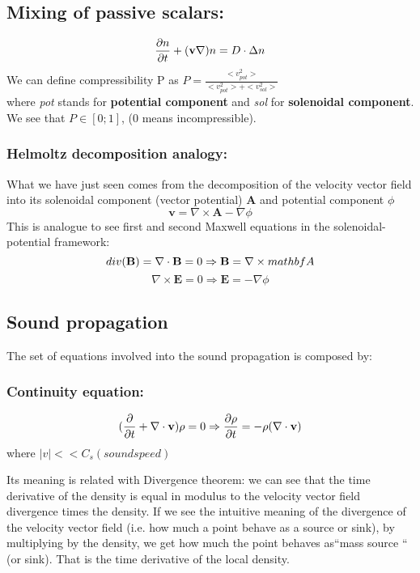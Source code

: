 \documentclass[a4paper,11pt]{article}
\begin{document}
\subsection{Mixing of passive scalars:}
\[ \pdv{n}{t}+(\mathbf{v} \nabla)n = D \cdot \Delta n \]
We can define compressibility P as $P=\frac{<v_{pot}^2>}{<v_{pot}^2>+<v_{sol}^2>}$\\
where \emph{pot} stands for \textbf{potential component} and \emph{sol} for \textbf{solenoidal component}. We see that $P \in [0;1]$, (0 means incompressible).

\subsubsection{Helmoltz decomposition analogy:}
What we have just seen comes from the decomposition of the velocity vector field into its solenoidal component (vector potential) \textbf{A} and potential component $\phi$
\[  \mathbf{v}=\nabla \times \mathbf{A}-\nabla\phi \]
This is analogue to see first and second Maxwell equations in the solenoidal-potential framework:
\[  div(\mathbf{B})=\nabla \cdot \mathbf{B}=0 \Rightarrow \mathbf{B}=\nabla\times\\mathbf{A} \]
\[  \nabla \times \mathbf{E}=0 \Rightarrow \mathbf{E}=-\nabla\phi  \]



\subsection{Sound propagation}
The set of equations involved into the sound propagation is composed by:
\subsubsection{Continuity equation:}
\[  (\pdv{}{t}+\nabla \cdot \mathbf{v})\rho=0 \Rightarrow \pdv{\rho}{t}=- \rho ( \nabla \cdot \mathbf{v})     \] where $|v|<<C_s (sound speed)$

Its meaning is related with Divergence theorem: %
we can see that the time derivative of the density is equal in modulus to the velocity vector field divergence times the density. 
If we see the intuitive meaning of the divergence of the velocity vector field (i.e. how much a point behave as a source or sink), by multiplying by the density, we get how much the point behaves as``mass source `` (or sink). 
That is the time derivative of the local density.
\end{document}

